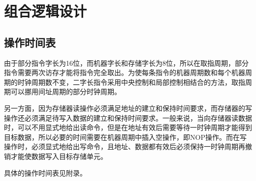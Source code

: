 \documentclass[UTF8]{ctexrep}
\begin{document}
\chapter{组合逻辑设计}

\section{操作时间表}
由于部分指令字长为16位，而机器字长和存储字长为8位，所以在取指周期，部分指令需要两次访存才能将指令完全取出。为使每条指令的机器周期数和每个机器周期的时钟周期数不变，二字长指令采用中央控制和局部控制相结合的方法，取指周期可以挪用间址周期的部分时钟周期。

另一方面，因为存储器读操作必须满足地址的建立和保持时间要求，而存储器的写操作还必须满足待写入数据的建立和保持时间要求。一般来说，当向存储器读数据时，可以不用显式地给出读命令，但是在地址有效后需要等待一时钟周期才能得到目标数据，所以必要的时间需要在机器周期中插入空操作，即NOP操作。而在写操作时，必须显式地给出写命令，且地址、数据都有效后必须保持一时钟周期再撤销才能使数据写入目标存储单元。


具体的操作时间表见附录。
\end{document}
